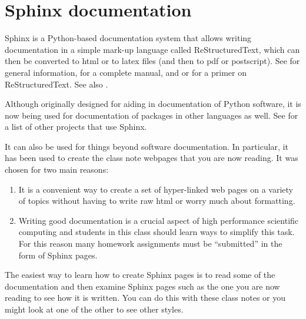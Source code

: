 \documentclass[letterpaper,10pt,english]{sphinxmanual}
\begin{document}
\section{Sphinx documentation}
\label{sphinx:sphinx}\label{sphinx:sphinx-documentation}\label{sphinx::doc}
Sphinx is a Python-based documentation system that allows writing
documentation in a simple mark-up language called ReStructuredText, which
can then be converted to html or to latex files (and then to pdf or
postscript).  See \label{sphinx:id1}{\hyperref[biblio:sphinx]{\crossref{{[}sphinx{]}}}} for general information,
\label{sphinx:id2}{\hyperref[biblio:sphinx\string-documentation]{}} for a
complete manual, and \label{sphinx:id3}{\hyperref[biblio:sphinx\string-rst]{}} or \label{sphinx:id4}{\hyperref[biblio:rst\string-documentation]{}}
for a primer on ReStructuredText.
See also \label{sphinx:id5}{\hyperref[biblio:sphinx\string-cheatsheet]{}}.

Although originally designed for aiding in documentation of Python software,
it is now being used for documentation of packages in other languages as
well.  See \label{sphinx:id6}{\hyperref[biblio:sphinx\string-examples]{}} for a list of other projects that use Sphinx.

It can also be used for things beyond software documentation.  In
particular, it has been used to create the class note webpages that you are
now reading.  It was chosen for two main reasons:
\begin{enumerate}
\item {} 
It is a convenient way to create a set of hyper-linked web pages on a variety
of topics without having to write raw html or worry much about formatting.

\item {} 
Writing good documentation is a crucial aspect of high performance
scientific computing and students in this class should learn ways to
simplify this task.  For this reason many homework assignments must be
``submitted'' in the form of Sphinx pages.

\end{enumerate}

The easiest way to learn how to create Sphinx pages is to read some of the
documentation
and then examine Sphinx pages such as the one you are now reading to see how
it is written.  You can do this with these class notes or you might look at
one of the other \label{sphinx:id7}{\hyperref[biblio:sphinx\string-examples]{}} to see other styles.
\end{document}
